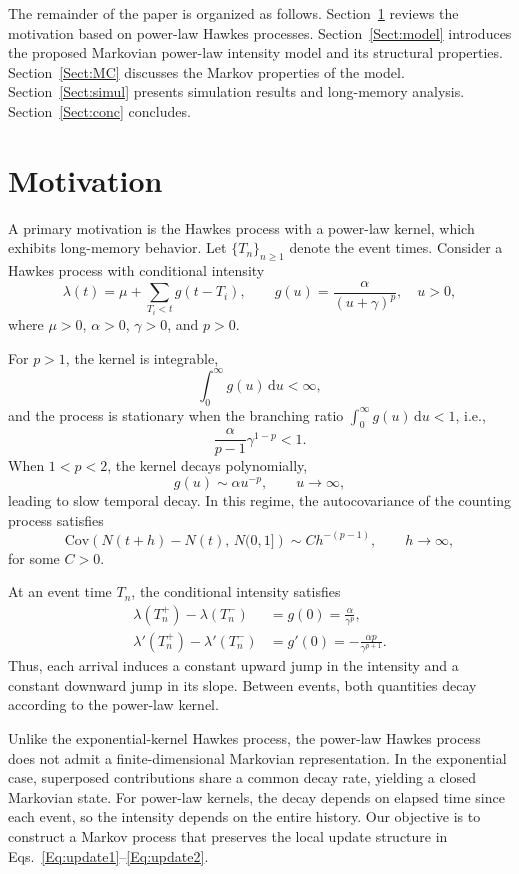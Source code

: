 \documentclass[11pt]{article}
\newcommand{\D}{\mathrm{d}}
\theoremstyle{definition}
\begin{document}
The remainder of the paper is organized as follows.
Section~\ref{Sect:motive} reviews the motivation based on power-law Hawkes processes.
Section~\ref{Sect:model} introduces the proposed Markovian power-law intensity model and its structural properties.
Section~\ref{Sect:MC} discusses the Markov properties of the model.
Section~\ref{Sect:simul} presents simulation results and long-memory analysis.
Section~\ref{Sect:conc} concludes.

\section{Motivation}\label{Sect:motive}

A primary motivation is the Hawkes process with a power-law kernel, which exhibits long-memory behavior.
Let $\{T_n\}_{n\ge1}$ denote the event times.
Consider a Hawkes process with conditional intensity
\[
\lambda(t)=\mu+\sum_{T_i<t} g(t-T_i),
\qquad 
g(u)=\frac{\alpha}{(u+\gamma)^p}, \quad u>0,
\]
where $\mu>0$, $\alpha>0$, $\gamma>0$, and $p>0$.

For $p>1$, the kernel is integrable,
\[
\int_0^\infty g(u)\,\D u<\infty,
\]
and the process is stationary when the branching ratio
$\int_0^\infty g(u)\,\D u<1$, i.e.,
\[
\frac{\alpha}{p-1}\gamma^{1-p}<1.
\]
When $1<p<2$, the kernel decays polynomially,
\[
g(u)\sim \alpha u^{-p}, \qquad u\to\infty,
\]
leading to slow temporal decay.
In this regime, the autocovariance of the counting process satisfies
\[
\mathrm{Cov}\!\left(N(t+h)-N(t),\,N(0,1]\right)
\sim C h^{-(p-1)}, \qquad h\to\infty,
\]
for some $C>0$.

At an event time $T_n$, the conditional intensity satisfies
\begin{align}
	\lambda(T_n^+)-\lambda(T_n^-)
	&= g(0)=\frac{\alpha}{\gamma^p}, \label{Eq:update1}\\
	\lambda'(T_n^+)-\lambda'(T_n^-)
	&= g'(0)=-\frac{\alpha p}{\gamma^{p+1}}. \label{Eq:update2}
\end{align}
Thus, each arrival induces a constant upward jump in the intensity and a constant downward jump in its slope.
Between events, both quantities decay according to the power-law kernel.

Unlike the exponential-kernel Hawkes process, the power-law Hawkes process does not admit a finite-dimensional Markovian representation.
In the exponential case, superposed contributions share a common decay rate, yielding a closed Markovian state.
For power-law kernels, the decay depends on elapsed time since each event, so the intensity depends on the entire history.
Our objective is to construct a Markov process that preserves the local update structure in
Eqs.~\eqref{Eq:update1}--\eqref{Eq:update2}.
\end{document}
